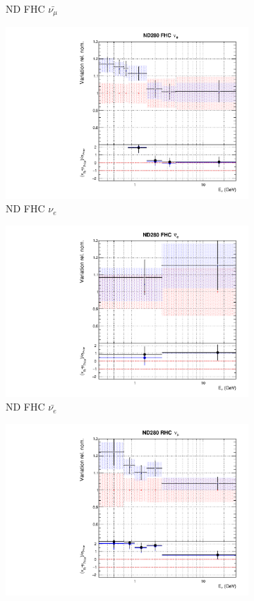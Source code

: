 \begin{figure}
\begin{subfigure}{0.24\textwidth}
  \caption{ND FHC $\bar{\nu_{\mu}}$}
\end{subfigure}
\begin{subfigure}{0.24\textwidth}
  \centering
  \includegraphics[width=0.95\linewidth]{figs/fixed2p2hflux2}
  \caption{ND FHC $\nu_{e}$}
\end{subfigure}
\begin{subfigure}{0.24\textwidth}
  \centering
  \includegraphics[width=0.95\linewidth]{figs/fixed2p2hflux3}
  \caption{ND FHC $\bar{\nu_{e}}$}
\end{subfigure}
\begin{subfigure}{0.24\textwidth}
  \centering
  \includegraphics[width=0.95\linewidth]{figs/fixed2p2hflux4}

\end{subfigure}
\end{figure}

